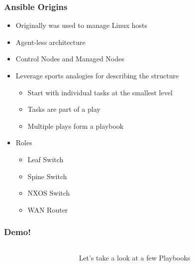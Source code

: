 \documentclass{beamer}
\begin{document}
\begin{frame}
  \frametitle{Ansible Origins}
  \begin{itemize}
    \item Originally was used to manage Linux hosts
    \item <2-> Agent-less architecture
    \item <3-> Control Nodes and Managed Nodes
    \item <4-> Leverage sports analogies for describing the structure
    \begin{itemize}
      \item <4-> Start with individual tasks at the smallest level
      \item <5-> Tasks are part of a play
      \item <6-> Multiple plays form a playbook
    \end{itemize}
    \item <7-> Roles
    \begin{itemize}
      \item <8-> Leaf Switch
      \item <8-> Spine Switch
      \item <8-> NXOS Switch
      \item <8-> WAN Router
    \end{itemize}
  \end{itemize}
\end{frame}

\begin{frame}
  \frametitle{Demo!}
  \begin{columns}
    \begin{column}{0.3\textwidth}
      \Huge
      \begin{center}
        \faDesktop 
        \hspace{.5cm}
        \faRocket     
      \end{center}
    \end{column}
    \begin{column}{0.7\textwidth}
      \huge 
      Let's take a look at a few Playbooks
    \end{column}
  \end{columns}
\end{frame}
\end{document}

